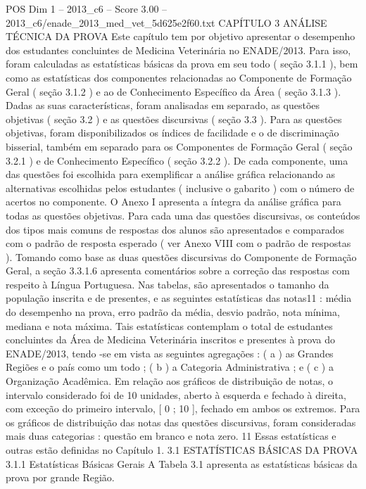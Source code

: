 \begin{textsample}{POS Dim 1 – 2013\_c6 – Score 3.00 – 2013\_c6/enade\_2013\_med\_vet\_5d625e2f60.txt}  \label{ex:f1_pos_171}
CAPÍTULO 3 ANÁLISE TÉCNICA DA PROVA Este capítulo tem por objetivo apresentar o desempenho dos estudantes concluintes de Medicina Veterinária no ENADE/2013.
Para isso, foram calculadas as estatísticas básicas da prova em seu todo ( seção 3.1.1 ), bem como as estatísticas dos componentes relacionadas ao Componente de Formação Geral ( seção 3.1.2 ) e ao de Conhecimento Específico da Área ( seção 3.1.3 ).
Dadas as suas características, foram analisadas em separado, as questões objetivas ( seção 3.2 ) e as questões discursivas ( seção 3.3 ).
Para as questões objetivas, foram disponibilizados os índices de facilidade e o de discriminação bisserial, também em separado para os Componentes de Formação Geral ( seção 3.2.1 ) e de Conhecimento Específico ( seção 3.2.2 ).
De cada componente, uma das questões foi escolhida para exemplificar a análise gráfica relacionando as alternativas escolhidas pelos estudantes ( inclusive o gabarito ) com o número de acertos no componente.
O Anexo I apresenta a íntegra da análise gráfica para todas as questões objetivas.
Para cada uma das questões discursivas, os conteúdos dos tipos mais comuns de respostas dos alunos são apresentados e comparados com o padrão de resposta esperado ( ver Anexo VIII com o padrão de respostas ).
Tomando como base as duas questões discursivas do Componente de Formação Geral, a seção 3.3.1.6 apresenta comentários sobre a correção das respostas com respeito à Língua Portuguesa.
Nas tabelas, são apresentados o tamanho da população inscrita e de presentes, e as seguintes estatísticas das notas11 : média do desempenho na prova, erro padrão da média, desvio padrão, nota mínima, mediana e nota máxima.
Tais estatísticas contemplam o total de estudantes concluintes da Área de Medicina Veterinária inscritos e presentes à prova do ENADE/2013, tendo -se em vista as seguintes agregações : ( a ) as Grandes Regiões e o país como um todo ; ( b ) a Categoria Administrativa ; e ( c ) a Organização Acadêmica.
Em relação aos gráficos de distribuição de notas, o intervalo considerado foi de 10 unidades, aberto à esquerda e fechado à direita, com exceção do primeiro intervalo, [ 0 ; 10 ], fechado em ambos os extremos.
Para os gráficos de distribuição das notas das questões discursivas, foram consideradas mais duas categorias : questão em branco e nota zero. 11 Essas estatísticas e outras estão definidas no Capítulo 1. 3.1 ESTATÍSTICAS BÁSICAS DA PROVA 3.1.1 Estatísticas Básicas Gerais A Tabela 3.1 apresenta as estatísticas básicas da prova por grande Região.

\end{textsample}
